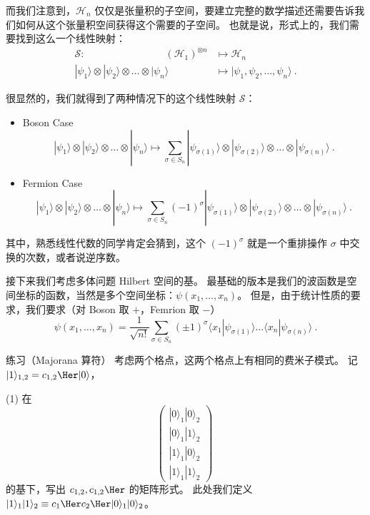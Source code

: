 而我们注意到，$\mathcal{H}_n$ 仅仅是张量积的子空间，要建立完整的数学描述还需要告诉我们如何从这个张量积空间获得这个需要的子空间。 也就是说，形式上的，我们需要找到这么一个线性映射：
\begin{equation}
\begin{aligned}
\mathcal{S}:\quad\quad\quad\quad\quad\quad\quad\quad (\mathcal{H}_1)^{\otimes n}&\mapsto\mathcal{H}_n\\
|\psi_1\rangle\otimes|\psi_2\rangle\otimes\dots\otimes|\psi_n\rangle &\mapsto|\psi_1,\psi_2,\dots,\psi_n\rangle~.
\end{aligned}
\end{equation}

很显然的，我们就得到了两种情况下的这个线性映射 $\mathcal{S}$：
\begin{itemize}
\item Boson Case
\begin{equation}
|\psi_1\rangle\otimes|\psi_2\rangle\otimes\dots\otimes|\psi_n\rangle \mapsto \sum_{{\sigma}\in S_n}|\psi_{\sigma(1)}\rangle\otimes|\psi_{\sigma(2)}\rangle\otimes\dots\otimes|\psi_{\sigma(n)}\rangle~.
\end{equation}
\item Fermion Case
\begin{equation}
|\psi_1\rangle\otimes|\psi_2\rangle\otimes\dots\otimes|\psi_n\rangle \mapsto \sum_{{\sigma}\in S_n}(-1)^{\sigma}|\psi_{\sigma(1)}\rangle\otimes|\psi_{\sigma(2)}\rangle\otimes\dots\otimes|\psi_{\sigma(n)}\rangle~.
\end{equation}
\end{itemize}

其中，熟悉线性代数的同学肯定会猜到，这个 $(-1)^{\sigma}$ 就是一个重排操作 $\sigma$ 中交换的次数，或者说逆序数。

接下来我们考虑多体问题 Hilbert 空间的基。 最基础的版本是我们的波函数是空间坐标的函数，当然是多个空间坐标：$\psi(x_1,\dots,x_n)$。 但是，由于统计性质的要求，我们要求（对 Boson 取 $+$，Femrion 取 $-$）
\begin{equation}
\psi(x_1,\dots,x_n)=\frac{1}{\sqrt{n!}}\sum_{\sigma\in S_n}(\pm1)^\sigma\langle x_1|\psi_{\sigma(1)}\rangle\dots\langle x_n|\psi_{\sigma(n)}\rangle~.
\end{equation}

\begin{exercise}{练习（Majorana 算符）}
考虑两个格点，这两个格点上有相同的费米子模式。 记 $|1\rangle_{1,2}=c_{1,2}\Her|0\rangle$，

(1) 在
\begin{equation}
\left(\begin{matrix}|0\rangle_1|0\rangle_2\\|0\rangle_1|1\rangle_2\\|1\rangle_1|0\rangle_2\\|1\rangle_1|1\rangle_2\end{matrix}\right) ~
\end{equation}
的基下，写出 $c_{1,2}, c_{1,2}\Her$ 的矩阵形式。 此处我们定义 $|1\rangle_1|1\rangle_2\equiv c_1\Her c_2\Her|0\rangle_1|0\rangle_2$。
\end{exercise}
